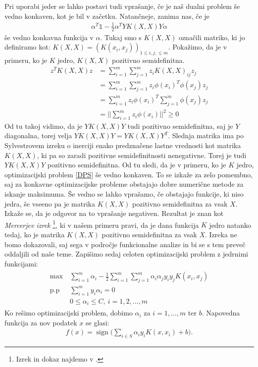 \documentclass[mat1]{fmfdelo}
\DeclareMathOperator{\sign}{sign}
\begin{document}
Pri uporabi jeder se lahko postavi tudi vprašanje, če je naš dualni problem še vedno konkaven, kot je bil v začetku. Natančneje, zanima nas, če je 
\begin{align*}
\alpha^T\mathds{1} - \frac{1}{2}\alpha^TYK(X,X)Y\alpha 
\end{align*}
še vedno konkavna funkcija v $\alpha$. Tukaj smo s $K(X,X)$ označili matriko, ki jo definiramo kot: $K(X, X) = (K(x_i, x_j))_{1\le i, j ,\le m}$. Pokažimo, da je v primeru, ko je $K$ jedro, $K(X, X)$  pozitivno semidefinitna.
\begin{align*}
z^TK(X, X)z &= \sum_{i=1}^{m}\sum_{j=1}^{m}z_iK(X, X)_{ij}z_j \\
&= \sum_{i=1}^{m}\sum_{j=1}^{m}z_i\phi(x_i)^T\phi(x_j)z_j  \\
&=  \sum_{i=1}^{m}z_i\phi(x_i)^T\sum_{j=1}^{m}\phi(x_j)z_j \\
&=  \Big|\Big|\sum_{i=1}^{m}z_i\phi(x_i)\Big|\Big|^2 \ge 0
\end{align*}
Od tu takoj vidimo, da je $YK(X, X)Y$ tudi pozitivno semidefinitna, saj je $Y$ diagonalna, torej velja $YK(X, X)Y = YK(X, X)Y^T$. Slednja matrika ima po Sylvestrovem izreku o inerciji enako predznačene lastne vrednosti kot matrika $K(X, X)$, ki pa so zaradi pozitivne semidefinitnosti nenegativne. Torej je tudi $YK(X, X)Y$ pozitivno semidefinitna. Od tu sledi, da je v primeru, ko je $K$ jedro, optimizacijski problem \eqref{DPS} še vedno konkaven. To se izkaže za zelo pomembno, saj za konkavne optimizacijske probleme obstajajo dobre numerične metode za iskanje maksimuma. Še vedno se lahko vprašamo, če obstajajo funkcije, ki niso jedra, še vseeno pa je matrika $K(X, X)$ pozitivno semidefinitna za vsak $X$. Izkaže se, da je odgovor na to vprašanje negativen. Rezultat je znan kot \emph{Mercerjev izrek} \footnote{Izrek in dokaz najdemo v \cite{Mercer}.}, ki v našem primeru pravi, da je dana funkcija $K$ jedro natanko tedaj, ko je matrika $K(X, X)$ pozitivno semidefinitna za vsak $X$. Izreka ne bomo dokazovali, saj sega v področje funkcionalne analize in bi se s tem preveč oddaljili od naše teme. 
Zapišimo sedaj celoten optimizacijski problem z jedrnimi funkcijami: 
\begin{align}
\begin{split}
\max~ &\sum_{i = 1}^{m}\alpha_i - \frac{1}{2}\sum_{i = 1}^{m}\sum_{j=1}^{m}\alpha_i\alpha_jy_iy_jK(x_i,x_j)\\
\text{p.p} ~ &\sum_{i = 1}^{m}y_i\alpha_i = 0\\
&0\le \alpha_i \le C, ~ i=1, 2, \ldots,m
\end{split}
\end{align}
Ko rešimo optimizacijski problem, dobimo $\alpha_i$ za $i = 1, \ldots,m $ ter $b$. Napovedna funkcija za nov podatek $x$ se glasi: 
\begin{align*}
f(x) = \sign\bigg(\sum_{i \in S}\alpha_iy_iK(x, x_i) + b\bigg).
\end{align*}
\end{document}
